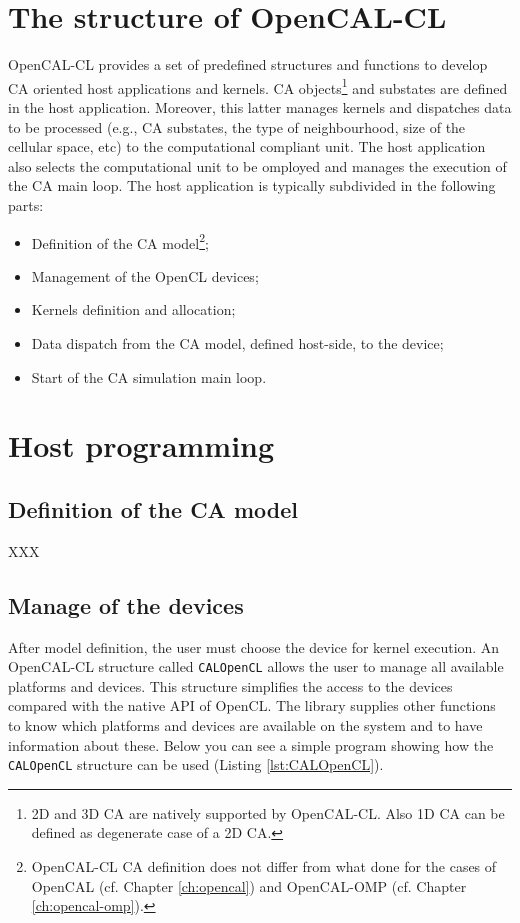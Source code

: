 \section{The structure of OpenCAL-CL}
OpenCAL-CL provides a set of predefined structures and functions to
develop CA oriented host applications and kernels. CA
objects\footnote{2D and 3D CA are natively supported by
  OpenCAL-CL. Also 1D CA can be defined as degenerate case of a 2D
  CA.} and substates are defined in the host application. Moreover,
this latter manages kernels and dispatches data to be processed (e.g.,
CA substates, the type of neighbourhood, size of the cellular space,
etc) to the computational compliant unit. The host application also
selects the computational unit to be omployed and manages the
execution of the CA main loop. The host application is typically
subdivided in the following parts:
\begin{itemize}
\item Definition of the CA model\footnote{OpenCAL-CL CA definition
  does not differ from what done for the cases of OpenCAL (cf. Chapter
  \ref{ch:opencal}) and OpenCAL-OMP (cf. Chapter
  \ref{ch:opencal-omp}).};
\item Management of the OpenCL devices;
\item Kernels definition and allocation;
\item Data dispatch from the CA model, defined host-side, to the device;
\item Start of the CA simulation main loop.
\end{itemize}

\section{Host programming} 

\subsection{Definition of the CA model}

XXX

\subsection{Manage of the devices}

After model definition, the user must choose the device for kernel
execution. An OpenCAL-CL structure called \verb'CALOpenCL' allows the
user to manage all available platforms and devices. This structure
simplifies the access to the devices compared with the native API of
OpenCL. The library supplies other functions to know which platforms
and devices are available on the system and to have information about
these. Below you can see a simple program showing how the
\verb'CALOpenCL' structure can be used (Listing \ref{lst:CALOpenCL}).


